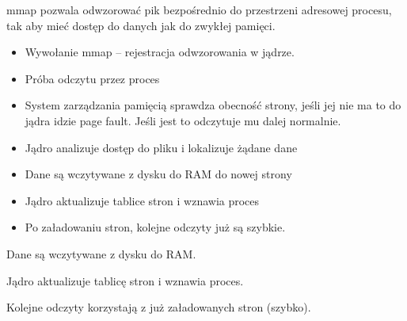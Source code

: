 mmap pozwala odwzorować pik bezpośrednio do przestrzeni adresowej procesu, tak aby mieć dostęp do danych jak do zwykłej pamięci.
\begin{itemize}
  \item Wywołanie mmap – rejestracja odwzorowania w jądrze.
  \item Próba odczytu przez proces
  \item System zarządzania pamięcią sprawdza obecność strony, jeśli jej nie ma to do jądra idzie page fault. Jeśli jest to odczytuje mu dalej normalnie.
  \item Jądro analizuje dostęp do pliku i lokalizuje żądane dane 
  \item Dane są wczytywane z dysku do RAM do nowej strony
  \item Jądro aktualizuje tablice stron i wznawia proces 
  \item Po załadowaniu stron, kolejne odczyty już są szybkie. 
\end{itemize}






Dane są wczytywane z dysku do RAM.

Jądro aktualizuje tablicę stron i wznawia proces.

Kolejne odczyty korzystają z już załadowanych stron (szybko).
